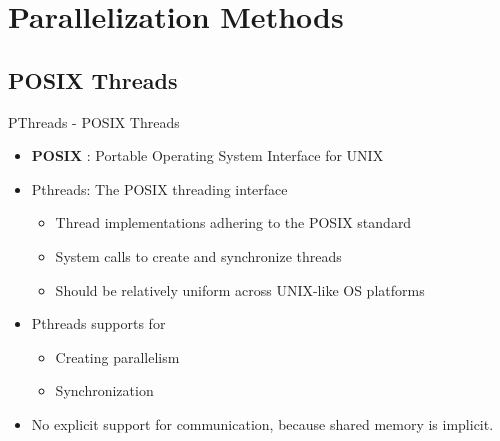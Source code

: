 \section{Parallelization Methods}
    \subsection{POSIX Threads}
        \begin{frame}{PThreads - POSIX Threads}
            \begin{itemize}
                \item {
                    \textbf{POSIX} : Portable Operating System Interface for UNIX
                    }
                \item { Pthreads: The POSIX threading interface}
                \begin{itemize}
                \item {Thread implementations adhering to the POSIX standard}
                \item {System calls to create and synchronize threads}
                \item {Should be relatively uniform across UNIX-like OS platforms }
                \end{itemize}
             \item {Pthreads supports for }
             \begin{itemize}
             \item {Creating parallelism}
             \item {Synchronization}
             \end{itemize}
             \item {No explicit support for communication, because shared 
memory is implicit.}
            \end{itemize}
        \end{frame}
        

